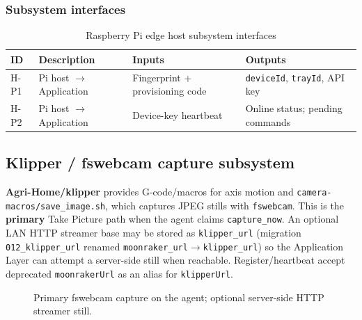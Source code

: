 \subsubsection{Subsystem interfaces}
\begin{table}[H]
\centering
\small
\begin{tabular}{|p{0.9cm}|p{3.4cm}|p{3.0cm}|p{3.5cm}|}
\hline
\textbf{ID} & \textbf{Description} & \textbf{Inputs} & \textbf{Outputs} \\
\hline
H-P1 & Pi host $\rightarrow$ Application & Fingerprint + provisioning code & \texttt{deviceId}, \texttt{trayId}, API key \\
\hline
H-P2 & Pi host $\rightarrow$ Application & Device-key heartbeat & Online status; pending commands \\
\hline
\end{tabular}
\caption{Raspberry Pi edge host subsystem interfaces}
\end{table}

\subsection{Klipper / fswebcam capture subsystem}

\textbf{Agri-Home/klipper}\cite{klipper} provides G-code/macros for axis motion and
\texttt{camera-macros/save\_image.sh}, which captures JPEG stills with \texttt{fswebcam}. This is
the \textbf{primary} Take Picture path when the agent claims \texttt{capture\_now}. An optional LAN
HTTP streamer base may be stored as \texttt{klipper\_url} (migration \texttt{012\_klipper\_url} renamed
\texttt{moonraker\_url}$\rightarrow$\texttt{klipper\_url}) so the Application Layer can attempt a
server-side still when reachable. Register/heartbeat accept deprecated \texttt{moonrakerUrl} as an
alias for \texttt{klipperUrl}.

\begin{figure}[H]
\centering
{}
\caption{Primary fswebcam capture on the agent; optional server-side HTTP streamer still.}
\label{fig:hw-moonraker}
\end{figure}

